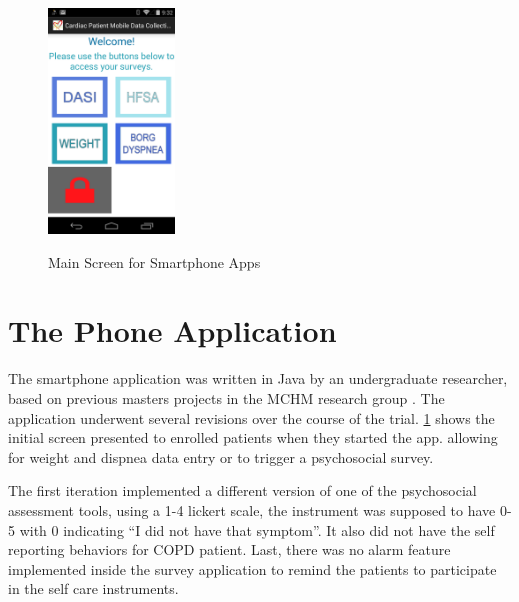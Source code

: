 \begin{figure}
 \begin{center}
  \label{fig:AndroidSplash}
  \includegraphics[scale=1,width=0.3\textwidth]{Images/AndroidSplash.png} 
  \caption{Main Screen for Smartphone Apps} 
 \end{center}
\end{figure}

\section{The Phone Application}

The smartphone application was written in Java by an undergraduate researcher, based on previous masters projects in the MCHM research group \cite{Louro2013,Putin2011}. The application underwent several revisions over the course of the trial. \cref{fig:AndroidSplash} shows the initial screen presented to enrolled patients when they started the app. allowing for weight and dispnea data entry or to trigger a psychosocial survey.

The first iteration implemented a different version of one of the psychosocial assessment tools, using a 1-4 lickert scale, the instrument was supposed to have 0-5 with 0 indicating ``I did not have that symptom''. It also did not have the self reporting behaviors for COPD patient. Last, there was no alarm feature implemented inside the survey application to remind the patients to participate in the self care instruments.

